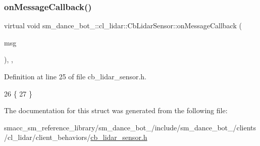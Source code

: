 \subsubsection{\texorpdfstring{on\+Message\+Callback()}{onMessageCallback()}}
{\footnotesize\ttfamily virtual void sm\+\_\+dance\+\_\+bot\+\_\+::cl\+\_\+lidar\+::\+Cb\+Lidar\+Sensor\+::on\+Message\+Callback (\begin{DoxyParamCaption}\item[{const sensor\+\_\+msgs\+::\+Laser\+Scan \&}]{msg }\end{DoxyParamCaption})\hspace{0.3cm}{\ttfamily [inline]}, {\ttfamily [override]}, {\ttfamily [virtual]}}



Definition at line 25 of file cb\+\_\+lidar\+\_\+sensor.\+h.


\begin{DoxyCode}
26   \{
27   \}
\end{DoxyCode}


The documentation for this struct was generated from the following file\+:\begin{DoxyCompactItemize}
\item 
smacc\+\_\+sm\+\_\+reference\+\_\+library/sm\+\_\+dance\+\_\+bot\+\_/include/sm\+\_\+dance\+\_\+bot\+\_/clients/cl\+\_\+lidar/client\+\_\+behaviors/\hyperlink{2_2include_2sm__dance__bot__2_2clients_2cl__lidar_2client__behaviors_2cb__lidar__sensor_8h}{cb\+\_\+lidar\+\_\+sensor.\+h}\end{DoxyCompactItemize}
